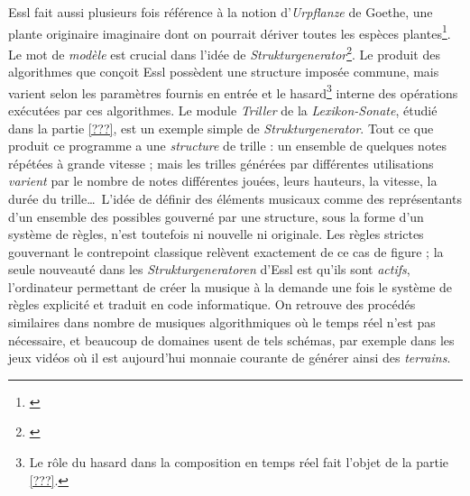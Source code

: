 \documentclass[a4paper,12pt]{article}
\begin{document}
Essl fait aussi plusieurs fois référence à la notion d'\emph{Urpflanze} de Goethe, une plante originaire imaginaire dont on pourrait dériver toutes les espèces plantes\footnote{\cite{goethe1993italienische}}. Le mot de \emph{modèle} est crucial dans l'idée de \emph{Strukturgenerator}\footnote{\cite{Strukturgeneratoren - Algorithmische Komposition in Echtzeit}}. Le produit des algorithmes que conçoit Essl possèdent une structure imposée commune, mais varient selon les paramètres fournis en entrée et le hasard\footnote{Le rôle du hasard dans la composition en temps réel fait l'objet de la partie \ref{???}.} interne des opérations exécutées par ces algorithmes. Le module \emph{Triller} de la \emph{Lexikon-Sonate}, étudié dans la partie \ref{???}, est un exemple simple de \emph{Strukturgenerator}. Tout ce que produit ce programme a une \emph{structure} de trille : un ensemble de quelques notes répétées à grande vitesse ; mais les trilles générées par différentes utilisations \emph{varient} par le nombre de notes différentes jouées, leurs hauteurs, la vitesse, la durée du trille\dots~L'idée de définir des éléments musicaux comme des représentants d'un ensemble des possibles gouverné par une structure, sous la forme d'un système de règles, n'est toutefois ni nouvelle ni originale. Les règles strictes gouvernant le contrepoint classique relèvent exactement de ce cas de figure ; la seule nouveauté dans les \emph{Strukturgeneratoren} d'Essl est qu'ils sont \emph{actifs}, l'ordinateur permettant de créer la musique à la demande une fois le système de règles explicité et traduit en code informatique. On retrouve des procédés similaires dans nombre de musiques algorithmiques où le temps réel n'est pas nécessaire, et beaucoup de domaines usent de tels schémas, par exemple dans les jeux vidéos où il est aujourd'hui monnaie courante de générer ainsi des \emph{terrains}. \\
\end{document}
